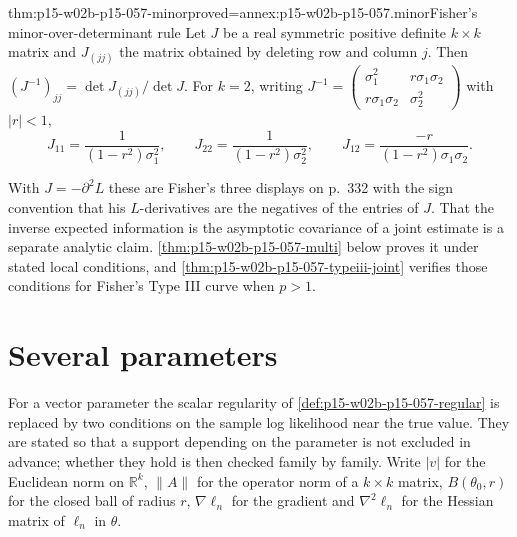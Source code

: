 \begin{hbtheorem}{thm:p15-w02b-p15-057-minor}{proved=annex:p15-w02b-p15-057.minor}{Fisher's minor-over-determinant rule}
Let \(J\) be a real symmetric positive definite \(k\times k\) matrix and
\(J_{(jj)}\) the matrix obtained by deleting row and column \(j\). Then
\((J^{-1})_{jj}=\det J_{(jj)}/\det J\). For \(k=2\), writing
\(J^{-1}=\begin{pmatrix}\sigma_1^2&r\sigma_1\sigma_2\\
r\sigma_1\sigma_2&\sigma_2^2\end{pmatrix}\) with \(|r|<1\),
\[
 J_{11}=\frac{1}{(1-r^2)\sigma_1^2},\qquad
 J_{22}=\frac{1}{(1-r^2)\sigma_2^2},\qquad
 J_{12}=\frac{-r}{(1-r^2)\sigma_1\sigma_2}.
\]
\end{hbtheorem}

With \(J=-\partial^2L\) these are Fisher's three displays on p.~332 with
the sign convention that his \(L\)-derivatives are the negatives of the
entries of \(J\). That the inverse expected information is the
asymptotic covariance of a joint estimate is a separate analytic claim.
\cref{thm:p15-w02b-p15-057-multi} below proves it under stated local
conditions, and \cref{thm:p15-w02b-p15-057-typeiii-joint} verifies those
conditions for Fisher's Type III curve when \(p>1\).

\section{Several parameters}
\label{sec:p15-w02b-p15-057-several}

For a vector parameter the scalar regularity of
\cref{def:p15-w02b-p15-057-regular} is replaced by two conditions on the
sample log likelihood near the true value. They are stated so that a
support depending on the parameter is not excluded in advance; whether
they hold is then checked family by family. Write \(|v|\) for the
Euclidean norm on \(\mathbb R^k\), \(\|A\|\) for the operator norm of a
\(k\times k\) matrix, \(B(\theta_0,r)\) for the closed ball of radius
\(r\), \(\nabla\ell_n\) for the gradient and \(\nabla^2\ell_n\) for the
Hessian matrix of \(\ell_n\) in \(\theta\).

